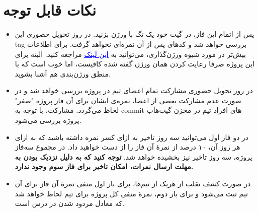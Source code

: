 \documentclass[]{article}
\begin{document}
\newpage
\pagestyle{fancy}
\fancyhf{}
\fancyfoot{}
\cfoot{\thepage}
\renewcommand{\headrulewidth}{2pt}

\KashidaOff



\tableofcontents

\newpage

 \Large \textbf{\\\\
}


\section*{{\titr نکات قابل توجه}}
\begin{itemize}
\item
پس از اتمام این فاز، در گیت خود یک تگ با ورژن  بزنید. در روز تحویل حضوری این tag بررسی خواهد شد و کدهای پس از آن نمره‌ای نخواهد گرفت. برای اطلاعات بیش‌تر در مورد شیوه ورژن‌گذاری، می‌توانید به
 \href{https://semver.org/}{\textcolor{blue}{\underline{این لینک}}}
 مراجعه کنید. البته برای این پروژه صرفا رعایت کردن همان ورژن گفته شده کافیست، اما خوب‌ است که با منطق ورژن‌بندی هم آشنا بشوید.

\item
در روز تحویل حضوری مشارکت تمام اعضای تیم در پروژه بررسی خواهد‌ شد و در صورت عدم مشارکت بعضی از اعضا، نمره‌ی ایشان برای آن فاز پروژه "صفر" لحاظ می‌گردد. مشارکت، با توجه به commit های افراد تیم در مخزن گیت‌هاب پروژه بررسی می‌شود.

\item
در دو فاز اول می‌توانید سه روز تاخیر به ازای کسر نمره داشته‌ باشید که به ازای هر روز آن، ۱۰ درصد از نمرهٔ آن فاز را از دست خواهید‌ داد. در مجموع سه‌فاز پروژه، سه روز تاخیر نیز بخشیده خواهد‌ شد. \textbf{توجه کنید که به دلیل نزدیک بودن به مهلت ارسال نمرات، امکان تاخیر برای فاز سوم وجود ندارد.}


\item
در صورت کشف تقلب از هریک از تیم‌ها، برای بار اول منفی نمرهٔ آن فاز برای آن تیم ثبت می‌شود و برای بار دوم، نمرهٔ منفی کل پروژه برای تیم لحاظ خواهد‌ شد که معادل مردود شدن در درس است.


\end{itemize}
\end{document}
